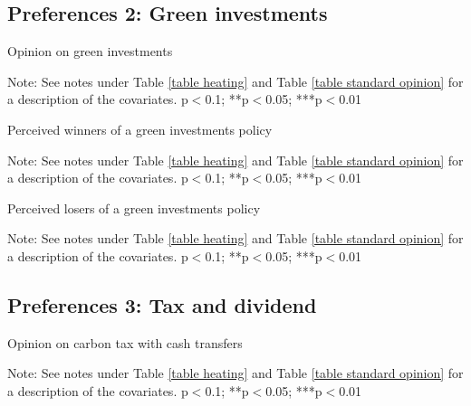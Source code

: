 \documentclass{article}
\begin{document}
\clearpage
\subsection{Preferences 2: Green investments}

\begin{table}[h!]
	\caption{Opinion on green investments}
	\begin{center}
		\scalebox{0.7}{}
	\end{center}
	{\footnotesize Note: See notes under Table \ref{table heating} and Table \ref{table standard opinion} for a description of the covariates.
	\newline *p$<$0.1; **p$<$0.05; ***p$<$0.01}
\end{table}	

\begin{table}[h!]
	\caption{Perceived winners of a green investments policy}
	\begin{center}
		\scalebox{0.7}{}
	\end{center}
	{\footnotesize Note: See notes under Table \ref{table heating} and Table \ref{table standard opinion} for a description of the covariates.
	\newline *p$<$0.1; **p$<$0.05; ***p$<$0.01}
\end{table}	

\begin{table}[h!]
	\caption{Perceived losers of a green investments policy}
	\begin{center}
		\scalebox{0.7}{}
	\end{center}
	{\footnotesize Note: See notes under Table \ref{table heating} and Table \ref{table standard opinion} for a description of the covariates.
	\newline *p$<$0.1; **p$<$0.05; ***p$<$0.01}
\end{table}	

\clearpage
\subsection{Preferences 3: Tax and dividend}

\begin{table}[h!]
	\caption{Opinion on carbon tax with cash transfers}
	\begin{center}
		\scalebox{0.7}{}
	\end{center}
	{\footnotesize Note: See notes under Table \ref{table heating} and Table \ref{table standard opinion} for a description of the covariates.
	\newline *p$<$0.1; **p$<$0.05; ***p$<$0.01}
\end{table}	
\end{document}
